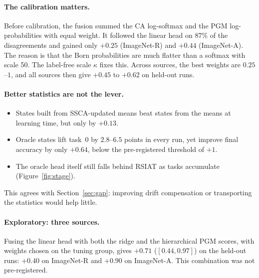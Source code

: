 \paragraph{The calibration matters.}
Before calibration, the fusion summed the CA log-softmax and the PGM
log-probabilities with equal weight. It followed the linear head on $87\%$
of the disagreements and gained only $+0.25$ (ImageNet-R) and $+0.44$
(ImageNet-A). The reason is that the Born probabilities are much flatter
than a softmax with scale 50. The label-free scale $\kappa$ fixes this.
Across sources, the best weights are $0.25$--$1$, and all sources then give
$+0.45$ to $+0.62$ on held-out runs.

\paragraph{Better statistics are not the lever.}
\begin{itemize}
  \item States built from SSCA-updated means beat states from the means at
    learning time, but only by $+0.13$.
  \item Oracle states lift task~0 by $2.8$--$6.5$ points in every run, yet
    improve final accuracy by only $+0.64$, below the pre-registered
    threshold of $+1$.
  \item The oracle head itself still falls behind RSIAT as tasks accumulate
    (Figure~\ref{fig:stage}).
\end{itemize}
This agrees with Section~\ref{sec:gap}: improving drift compensation or
transporting the statistics would help little.

\paragraph{Exploratory: three sources.}
Fusing the linear head with both the ridge and the hierarchical PGM scores,
with weights chosen on the tuning group, gives $+0.71$
($[0.44, 0.97]$) on the held-out runs: $+0.40$ on ImageNet-R and $+0.90$ on
ImageNet-A. This combination was not pre-registered.
